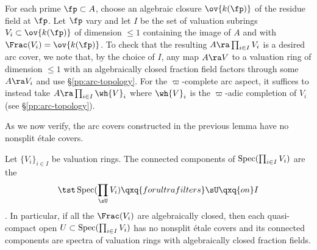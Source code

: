 \bpf %
For each prime $\fp \subset A$, choose an algebraic closure $\ov{k(\fp)}$ of the residue field at $\fp$. Let $\fp$ vary and let $I$ be the set of valuation subrings $V_i \subset \ov{k(\fp)}$ of dimension $\le 1$ containing the image of $A$ and with $\Frac(V_i) = \ov{k(\fp)}$. To check that the resulting $A \ra \prod_{i \in I} V_i$ is a desired arc cover, we note that, by the choice of $I$, any map $A \ra V$ to a valuation ring of dimension $\le 1$ with an algebraically closed fraction field factors through some $A \ra V_i$ and use \S\ref{pp:arc-topology}.
For the $\varpi$-complete arc aspect, it suffices to instead take  $A \ra \prod_{i \in I} \wh{V}_i$ where $\wh{V}_i$ is the $\varpi$-adic completion of $V_i$ (see \S\ref{pp:arc-topology}). %
\epf





As we now verify, the arc covers constructed in the previous lemma have no nonsplit \'{e}tale covers.

\blem \label{lem:ultrafilters}
Let $\{V_i\}_{i \in I}$ be valuation rings. The connected components of $\operatorname{Spec}(\prod_{i \in I} V_i)$ are the
\[
\tst \Spec(\prod_{\sU} V_i) \qxq{for ultrafilters} \sU \qxq{on} I
\]
. In particular, if all the $\Frac(V_i)$ are algebraically closed, then each quasi-compact open  $U \subset \operatorname{Spec}(\prod_{i \in I} V_i)$ has no nonsplit \'{e}tale covers and its connected components are spectra of valuation rings with algebraically closed fraction fields. %
\elem

